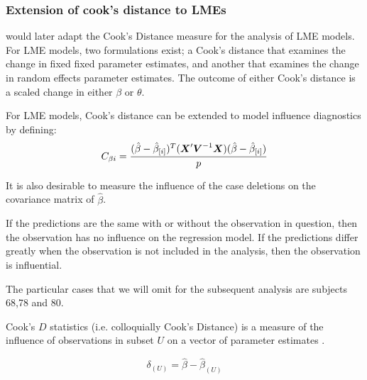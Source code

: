 \documentclass[12pt, a4paper]{report}
\theoremstyle{plain}
\theoremstyle{definition}
\theoremstyle{remark}
\begin{document}
	

	
\subsubsection{Extension of cook's distance to LMEs}
\citet{Christensen} would later adapt the Cook's Distance measure for the analysis of LME models. For LME models, two formulations exist; a Cook's distance that examines the change in fixed fixed parameter estimates, and another that examines the change in random effects parameter estimates. The outcome of either Cook's distance is a scaled change in either $\beta$ or $\theta$.

For LME models, Cook's distance can be extended to model influence diagnostics by defining:
\[ C_{\beta i} = {(\hat{\beta} - \hat{\beta}_{[i]})^{T}(\boldsymbol{X}^{\prime}\boldsymbol{V}^{-1}\boldsymbol{X}) (\hat{\beta} - \hat{\beta}_{[i]}) \over p}\]

It is also desirable to measure the influence of the case deletions on the covariance matrix of $\hat{\beta}$.

	

If the predictions are the same with or without the observation in question, then the observation has no influence on the regression model. If the predictions differ greatly when the observation is not included in the analysis, then the observation is influential.

The particular cases that we will omit for the subsequent analysis are subjects 68,78 and 80.
	
	
	

	 Cook's $D$ statistics (i.e. colloquially Cook's Distance) is a measure of the influence of observations in subset $U$ on a vector of parameter estimates \citep{cook77}.
	
	\[ \delta_{(U)} = \hat{\beta} - \hat{\beta}_{(U)}\]
	
\end{document}
